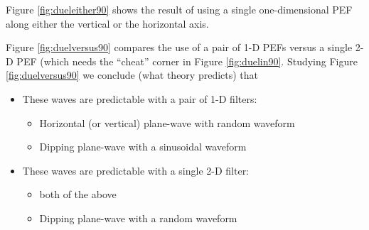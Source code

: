 \par
Figure \ref{fig:dueleither90} shows
the result of using a single one-dimensional PEF
along either the vertical or the horizontal axis.



\par

Figure \ref{fig:duelversus90} compares
the use of a pair of 1-D PEFs versus a single 2-D PEF
(which needs the ``cheat'' corner in Figure \ref{fig:duelin90}.
Studying Figure \ref{fig:duelversus90} we conclude
(what theory predicts) that
\begin{itemize}
        \item These waves are predictable with a pair of 1-D filters:
        \begin{itemize}
                \item Horizontal (or vertical) plane-wave with random waveform
                \item Dipping plane-wave with a sinusoidal waveform
        \end{itemize}
        \item These waves are predictable with a single 2-D filter:
        \begin{itemize}
                \item both of the above
                \item Dipping plane-wave with a random waveform
        \end{itemize}
\end{itemize}

